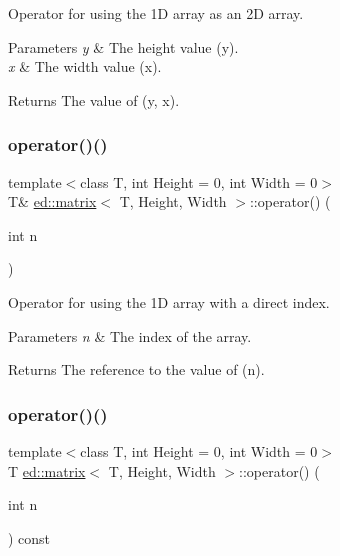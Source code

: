 Operator for using the 1D array as an 2D array.


\begin{DoxyParams}{Parameters}
{\em y} & The height value (y). \\
\hline
{\em x} & The width value (x).\\
\hline
\end{DoxyParams}
\begin{DoxyReturn}{Returns}
The value of (y, x). 
\end{DoxyReturn}
\mbox{\label{classed_1_1matrix_aee4710cd7dd60dc960087bc3466d2881}} 
\subsubsection{\texorpdfstring{operator()()}{operator()()}\hspace{0.1cm}{\footnotesize\ttfamily [3/4]}}
{\footnotesize\ttfamily template$<$class T, int Height = 0, int Width = 0$>$ \\
T\& \mbox{\hyperlink{classed_1_1matrix}{ed\+::matrix}}$<$ T, Height, Width $>$\+::operator() (\begin{DoxyParamCaption}\item[{int}]{n }\end{DoxyParamCaption})\hspace{0.3cm}{\ttfamily [inline]}}

Operator for using the 1D array with a direct index.


\begin{DoxyParams}{Parameters}
{\em n} & The index of the array.\\
\hline
\end{DoxyParams}
\begin{DoxyReturn}{Returns}
The reference to the value of (n). 
\end{DoxyReturn}
\mbox{\label{classed_1_1matrix_ac3928d0287a81060742db500412e530e}} 
\subsubsection{\texorpdfstring{operator()()}{operator()()}\hspace{0.1cm}{\footnotesize\ttfamily [4/4]}}
{\footnotesize\ttfamily template$<$class T, int Height = 0, int Width = 0$>$ \\
T \mbox{\hyperlink{classed_1_1matrix}{ed\+::matrix}}$<$ T, Height, Width $>$\+::operator() (\begin{DoxyParamCaption}\item[{int}]{n }\end{DoxyParamCaption}) const\hspace{0.3cm}{\ttfamily [inline]}}

